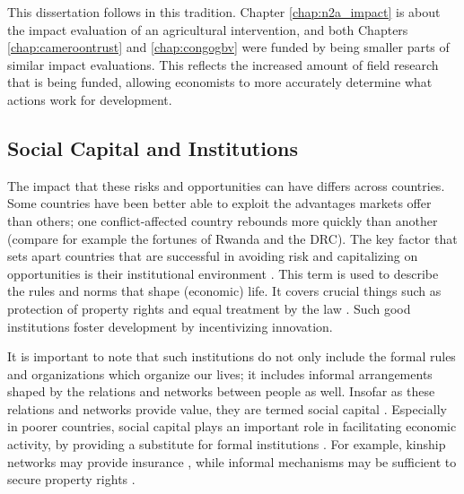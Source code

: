 This dissertation follows in this tradition. Chapter \ref{chap:n2a_impact} is about the impact evaluation of an agricultural intervention, and both Chapters \ref{chap:cameroontrust} and \ref{chap:congogbv} were funded by being smaller parts of similar impact evaluations. This reflects the increased amount of field research that is being funded, allowing economists to more accurately determine what actions work for development.

\subsection{Social Capital and Institutions}
The impact that these risks and opportunities can have differs across countries. Some countries have been better able to exploit the advantages markets offer than others; one conflict-affected country rebounds more quickly than another (compare for example the fortunes of Rwanda and the DRC). The key factor that sets apart countries that are successful in avoiding risk and capitalizing on opportunities is their institutional environment \citep{Rodrik2004,Acemoglu2000}. This term is used to describe the rules and norms that shape (economic) life. It covers crucial things such as protection of property rights and equal treatment by the law \citep{Acemoglu2005}. Such good institutions  foster development by incentivizing innovation. %

It is important to note that such institutions do not only include the formal rules and organizations which organize our lives; it includes informal arrangements shaped by the relations and networks between people as well. Insofar as these relations and networks provide value, they are termed social capital \citep[see for a more detailed discussion of the definition of the term][]{Putnam2001}. Especially in poorer countries, social capital plays an important role in facilitating economic activity, by providing a substitute for formal institutions \citep{Knack1997}. For example, kinship networks may provide insurance \citep{DiFalco2011}, while informal mechanisms may be sufficient to secure property rights \citep{Platteau1996}. 

